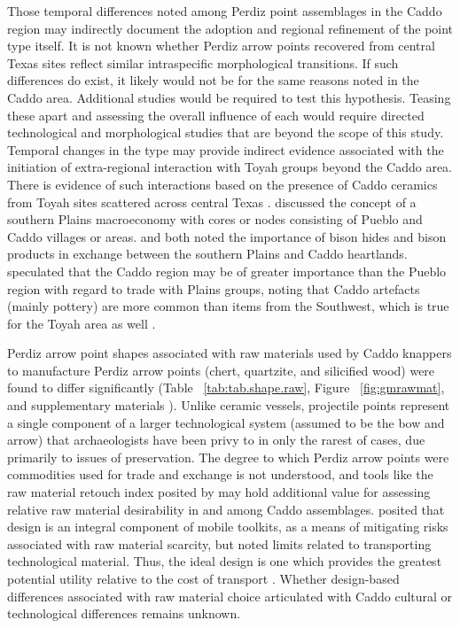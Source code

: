 \documentclass[review]{elsarticle}
\begin{document}
Those temporal differences noted among Perdiz point assemblages in the Caddo region may indirectly document the adoption and regional refinement of the point type itself. It is not known whether Perdiz arrow points recovered from central Texas sites reflect similar intraspecific morphological transitions. If such differences do exist, it likely would not be for the same reasons noted in the Caddo area. Additional studies would be required to test this hypothesis.
Teasing these apart and assessing the overall influence of each would require directed technological and morphological studies that are beyond the scope of this study. Temporal changes in the type may provide indirect evidence associated with the initiation of extra-regional interaction with Toyah groups beyond the Caddo area. There is evidence of such interactions based on the presence of Caddo ceramics from Toyah sites scattered across central Texas \citep{RN9001}. \citet{RN6910} discussed the concept of a southern Plains macroeconomy with cores or nodes consisting of Pueblo and Caddo villages or areas. \citet{RN6046} and \citet{RN6910} both noted the importance of bison hides and bison products in exchange between the southern Plains and Caddo heartlands. \citet{RN6910} speculated that the Caddo region may be of greater importance than the Pueblo region with regard to trade with Plains groups, noting that Caddo artefacts (mainly pottery) are more common than items from the Southwest, which is true for the Toyah area as well \citep{RN8999}.

Perdiz arrow point shapes associated with raw materials used by Caddo knappers to manufacture Perdiz arrow points (chert, quartzite, and silicified wood) were found to differ significantly (Table ~\ref{tab:tab.shape.raw}, Figure ~\ref{fig:gmrawmat}, and supplementary materials \citealp{RN8980}). Unlike ceramic vessels, projectile points represent a single component of a larger technological system (assumed to be the bow and arrow) that archaeologists have been privy to in only the rarest of cases, due primarily to issues of preservation. The degree to which Perdiz arrow points were commodities used for trade and exchange is not understood, and tools like the raw material retouch index posited by \citet{RN6541} may hold additional value for assessing relative raw material desirability in and among Caddo assemblages. \citet{RN6363} posited that design is an integral component of mobile toolkits, as a means of mitigating risks associated with raw material scarcity, but noted limits related to transporting technological material. Thus, the ideal design is one which provides the greatest potential utility relative to the cost of transport \citep{RN6363}. Whether design-based differences associated with raw material choice articulated with Caddo cultural or technological differences remains unknown.
\end{document}
